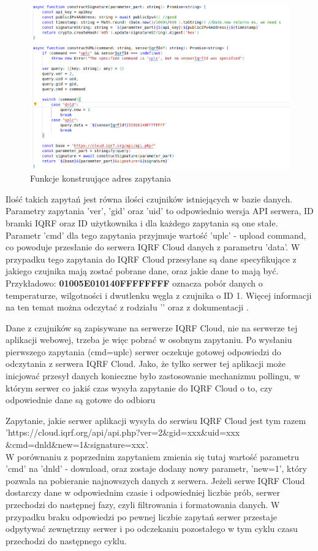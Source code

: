 \begin{figure}[H]
    \includegraphics[width=\textwidth]{zdj/app/construct-url.png}
    \caption{Funkcje konstruujące adres zapytania}
    \label{construct-url}
\end{figure}

Ilość takich zapytań jest równa ilości czujników istniejących
w bazie danych. Parametry zapytania 'ver', 'gid' oraz 'uid' to odpowiednio wersja API serwera, ID bramki IQRF oraz ID użytkownika i dla każdego zapytania są one 
stałe. Parametr 'cmd' dla tego zapytania przyjmuje wartość 'uplc' - upload command, co powoduje przesłanie do serwera IQRF Cloud danych z parametru 'data'.
W przypadku tego zapytania do IQRF Cloud przesyłane są dane specyfikujące z jakiego czujnika mają zostać pobrane dane, oraz jakie dane to mają być. 
Przykładowo: \textbf{01005E010140FFFFFFFF} oznacza pobór danych o temperaturze, wilgotności i dwutlenku węgla z czujnika o ID 1. Więcej informacji na ten temat 
można odczytać z rodziału '' oraz z dokumentacji \cite{protronix-comms}.

Dane z czujników są zapisywane na serwerze IQRF Cloud, nie na serwerze tej aplikacji webowej, trzeba je więc pobrać w osobnym zapytaniu. 
Po wysłaniu pierwszego zapytania (cmd=uplc) serwer oczekuje gotowej odpowiedzi do odczytania z serwera IQRF Cloud. Jako, że tylko serwer tej aplikacji może inicjować przesył danych
konieczne było zastosowanie mechanizmu pollingu, w którym serwer co jakiś czas wysyła zapytanie do IQRF Cloud o to, czy odpowiednie dane są gotowe do odbioru

Zapytanie, jakie serwer aplikacji wysyła do serwisu IQRF Cloud jest tym razem \\
'https://cloud.iqrf.org/api/api.php?ver=2\&gid=xxx\&uid=xxx\\\&cmd=dnld\&new=1\&signature=xxx'. \\ W porównaniu z poprzednim zapytaniem zmienia się tutaj wartość parametru
'cmd' na 'dnld' - download, oraz zostaje dodany nowy parametr, 'new=1', który pozwala na pobieranie najnowszych danych z serwera. Jeżeli serwe IQRF Cloud dostarczy dane
w odpowiednim czasie i odpowiedniej liczbie prób, serwer przechodzi do następnej fazy, czyli filtrowania i formatowania danych. W przypadku braku odpowiedzi po
pewnej liczbie zapytań serwer przestaje odpytywać zewnętrzny serwer i po odczekaniu pozostałego w tym cyklu czasu przechodzi do następnego cyklu.

